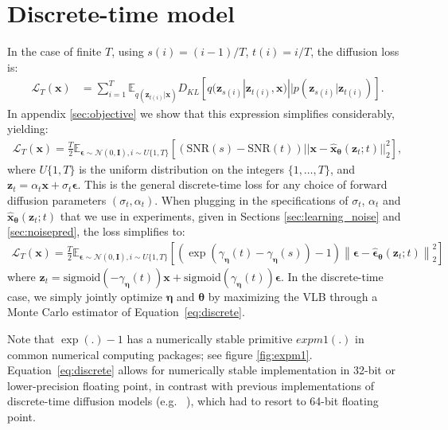 \documentclass{article}
\def\Eqref#1{Equation~\ref{#1}}
\def\rvx{{\mathbf{x}}}
\def\rvz{{\mathbf{z}}}
\newcommand{\E}{\mathbb{E}}
\newcommand{\bT}{{\boldsymbol{\theta}}}
\newcommand{\boldeta}{{\boldsymbol{\eta}}}
\newcommand{\bfI}{\mathbf{I}}
\newcommand{\bepsilon}{{\boldsymbol{\epsilon}}}
\newcommand{\lT}{\mathcal{L}_T(\rvx)}
\begin{document}
\section{Discrete-time model}

In the case of finite $T$, using $s(i) = (i-1)/T$, $t(i) = i/T$, the diffusion loss is:
\begin{align}
    \lT
    &= 
    \sum_{i=1}^T
    \E_{q(\rvz_{t(i)}|\rvx)} 
    D_{KL}[q(\rvz_{s(i)}|\rvz_{t(i)},\rvx)||p(\rvz_{s(i)}|\rvz_{t(i)})].
    \label{eq:main_finite_ELBO}
\end{align}
In appendix \ref{sec:objective} we show that this expression simplifies considerably, yielding:
\begin{align}
\lT =
\frac{T}{2}
\E_{\bepsilon \sim \mathcal{N}(0,\bfI), i \sim U\{1, T\}}
\left[
\left(\text{SNR}(s)-\text{SNR}(t)\right)
||\rvx - \hat{\rvx}_{\bT}(\rvz_t;t) ||_2^2
\right],
\label{eq:lT_main}\end{align}
where $U\{1, T\}$ is the uniform distribution on the integers $\{1,\ldots,T\}$, and $\rvz_t = \alpha_t \rvx + \sigma_t \bepsilon$. This is the general discrete-time loss for any choice of forward diffusion parameters $(\sigma_t,  \alpha_t)$.  When plugging in the specifications of $\sigma_t$, $\alpha_t$ and $\hat{\rvx}_{\bT}(\rvz_t; t)$ that we use in experiments, given in Sections \ref{sec:learning_noise} and \ref{sec:noisepred}, the loss simplifies to:
\begin{align}
\lT =
\frac{T}{2}
\E_{\bepsilon \sim \mathcal{N}(0,\bfI), i \sim U\{1, T\}}
\left[
(\exp(\gamma_{\boldeta}(t)-\gamma_{\boldeta}(s))-1)
\left\lVert\bepsilon - \hat{\bepsilon}_{\bT}(\rvz_t; t) \right\lVert_2^2
\right]
\label{eq:discrete}\end{align}
where $\rvz_t = \text{sigmoid}(-\gamma_{\boldeta}(t)) \rvx + \text{sigmoid}(\gamma_{\boldeta}(t)) \bepsilon$. 
In the discrete-time case, we simply jointly optimize $\boldeta$ and $\bT$ by maximizing the VLB through a Monte Carlo estimator of \Eqref{eq:discrete}.

Note that $\exp(.)-1$ has a numerically stable primitive $expm1(.)$ in common numerical computing packages; see figure \ref{fig:expm1}. \Eqref{eq:discrete} allows for numerically stable implementation in 32-bit or lower-precision floating point, in contrast with previous implementations of discrete-time diffusion models (e.g. ~\citep{ho2020denoising}), which had to resort to 64-bit floating point. 
\end{document}
